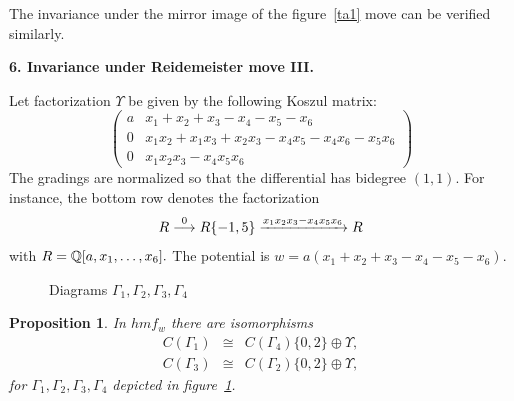 \documentclass[12pt]{article}
\newtheorem{prop}{Proposition}
\begin{document}
The invariance under the mirror image of the figure~\ref{ta1} move 
can be verified similarly. 

\vspace{0.1in} 




{\bf 6. Invariance under Reidemeister move III.} 

\vspace{0.1in} 

Let factorization $\Upsilon$ be given by the following Koszul matrix: 
\begin{equation*} 
 \left( \begin{array}{cc} a & x_1+x_2+x_3-x_4-x_5-x_6 \\
       0  & x_1x_2+x_1x_3+x_2x_3 - x_4x_5 -x_4x_6 -x_5x_6 \\
       0  & x_1 x_2 x_3 -x_4 x_5 x_6 \end{array} \right) 
\end{equation*} 
The gradings are normalized so that the differential has bidegree $(1,1).$ 
For instance, the bottom row denotes the factorization 
$$R \stackrel{0}{\longrightarrow} R\{-1,5\} \xrightarrow{x_1 x_2 x_3 -x_4 x_5 x_6}
       R $$
with $R=\mathbb Q[a,x_1, \dots, x_6].$ The potential is $w=a(x_1+x_2+x_3-x_4-x_5-x_6).$
                
\begin{figure}  \caption{Diagrams $\Gamma_1, \Gamma_2, 
\Gamma_3, \Gamma_4$} 
 \label{fourgr} \end{figure}

\begin{prop}\label{t-three} In $hmf_w$ there are isomorphisms 
\begin{eqnarray} 
   C(\Gamma_1) & \cong & C(\Gamma_4)\{0,2\} \oplus  \Upsilon ,  \\
 C(\Gamma_3) & \cong & C(\Gamma_2)\{0,2\} \oplus  \Upsilon , 
\end{eqnarray} 
for $\Gamma_1, \Gamma_2, \Gamma_3, \Gamma_4$ depicted in figure~\ref{fourgr}.  
\end{prop} 
\end{document}
